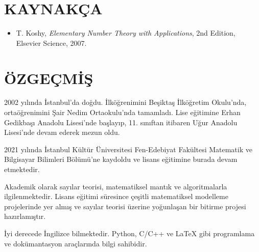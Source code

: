 \documentclass[a4paper,12pt]{article}
\begin{document}
\clearpage
\section*{KAYNAKÇA}

\vspace{1em}
\begin{itemize}
    \item[] [1] T. Koshy, \textit{Elementary Number Theory with Applications}, 2nd Edition, Elsevier Science, 2007.
\end{itemize}

\clearpage
\section*{ÖZGEÇMİŞ}

2002 yılında İstanbul’da doğdu. İlköğrenimini Beşiktaş İlköğretim Okulu’nda, 
ortaöğrenimini Şair Nedim Ortaokulu’nda tamamladı. Lise eğitimine Erhan Gedikbaşı Anadolu Lisesi’nde başlayıp, 
11. sınıftan itibaren Uğur Anadolu Lisesi’nde devam ederek mezun oldu.

2021 yılında İstanbul Kültür Üniversitesi Fen-Edebiyat Fakültesi Matematik ve Bilgisayar Bilimleri Bölümü’ne kaydoldu ve lisans eğitimine burada devam etmektedir.

Akademik olarak sayılar teorisi, matematiksel mantık ve algoritmalarla ilgilenmektedir. Lisans eğitimi süresince çeşitli matematiksel modelleme projelerinde yer almış ve sayılar teorisi üzerine yoğunlaşan bir bitirme projesi hazırlamıştır.

İyi derecede İngilizce bilmektedir. Python, C/C++ ve LaTeX gibi programlama ve dokümantasyon araçlarında bilgi sahibidir.
\end{document}
